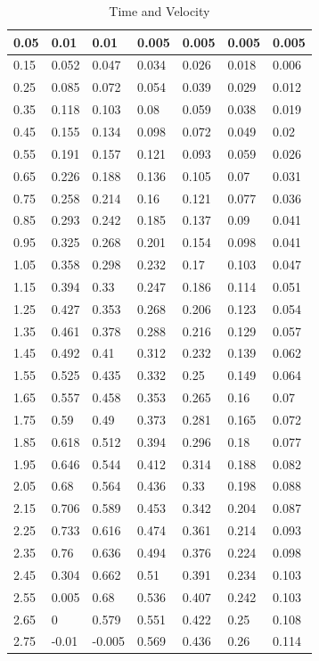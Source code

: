 \documentclass{article}
\begin{document}
	 	\begin{table}[!ht]
	 		\centering
	 		\begin{tabular}{|l|l|l|l|l|l|l|}
	 			\hline
	 			0.05 & 0.01 & 0.01 & 0.005 & 0.005 & 0.005 & 0.005 \\ \hline
	 			0.15 & 0.052 & 0.047 & 0.034 & 0.026 & 0.018 & 0.006 \\ \hline
	 			0.25 & 0.085 & 0.072 & 0.054 & 0.039 & 0.029 & 0.012 \\ \hline
	 			0.35 & 0.118 & 0.103 & 0.08 & 0.059 & 0.038 & 0.019 \\ \hline
	 			0.45 & 0.155 & 0.134 & 0.098 & 0.072 & 0.049 & 0.02 \\ \hline
	 			0.55 & 0.191 & 0.157 & 0.121 & 0.093 & 0.059 & 0.026 \\ \hline
	 			0.65 & 0.226 & 0.188 & 0.136 & 0.105 & 0.07 & 0.031 \\ \hline
	 			0.75 & 0.258 & 0.214 & 0.16 & 0.121 & 0.077 & 0.036 \\ \hline
	 			0.85 & 0.293 & 0.242 & 0.185 & 0.137 & 0.09 & 0.041 \\ \hline
	 			0.95 & 0.325 & 0.268 & 0.201 & 0.154 & 0.098 & 0.041 \\ \hline
	 			1.05 & 0.358 & 0.298 & 0.232 & 0.17 & 0.103 & 0.047 \\ \hline
	 			1.15 & 0.394 & 0.33 & 0.247 & 0.186 & 0.114 & 0.051 \\ \hline
	 			1.25 & 0.427 & 0.353 & 0.268 & 0.206 & 0.123 & 0.054 \\ \hline
	 			1.35 & 0.461 & 0.378 & 0.288 & 0.216 & 0.129 & 0.057 \\ \hline
	 			1.45 & 0.492 & 0.41 & 0.312 & 0.232 & 0.139 & 0.062 \\ \hline
	 			1.55 & 0.525 & 0.435 & 0.332 & 0.25 & 0.149 & 0.064 \\ \hline
	 			1.65 & 0.557 & 0.458 & 0.353 & 0.265 & 0.16 & 0.07 \\ \hline
	 			1.75 & 0.59 & 0.49 & 0.373 & 0.281 & 0.165 & 0.072 \\ \hline
	 			1.85 & 0.618 & 0.512 & 0.394 & 0.296 & 0.18 & 0.077 \\ \hline
	 			1.95 & 0.646 & 0.544 & 0.412 & 0.314 & 0.188 & 0.082 \\ \hline
	 			2.05 & 0.68 & 0.564 & 0.436 & 0.33 & 0.198 & 0.088 \\ \hline
	 			2.15 & 0.706 & 0.589 & 0.453 & 0.342 & 0.204 & 0.087 \\ \hline
	 			2.25 & 0.733 & 0.616 & 0.474 & 0.361 & 0.214 & 0.093 \\ \hline
	 			2.35 & 0.76 & 0.636 & 0.494 & 0.376 & 0.224 & 0.098 \\ \hline
	 			2.45 & 0.304 & 0.662 & 0.51 & 0.391 & 0.234 & 0.103 \\ \hline
	 			2.55 & 0.005 & 0.68 & 0.536 & 0.407 & 0.242 & 0.103 \\ \hline
	 			2.65 & 0 & 0.579 & 0.551 & 0.422 & 0.25 & 0.108 \\ \hline
	 			2.75 & -0.01 & -0.005 & 0.569 & 0.436 & 0.26 & 0.114 \\ \hline
	 		\end{tabular}
	 		\caption{Time and Velocity}
	 		\label{veltime}
	 	\end{table}
 	
\end{document}
